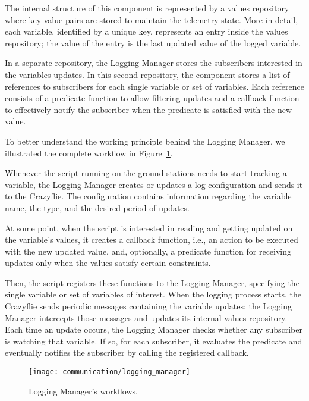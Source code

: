 The internal structure of this component is represented by a values repository where key-value pairs are stored to maintain the telemetry state.
More in detail, each variable, identified by a unique key, represents an entry inside the values repository; the value of the entry is the last updated value of the logged variable.

In a separate repository, the Logging Manager stores the subscribers interested in the variables updates. 
In this second repository, the component stores a list of references to subscribers for each single variable or set of variables. 
Each reference consists of a predicate function to allow filtering updates and a callback function to effectively notify the subscriber when the predicate is satisfied with the new value.

To better understand the working principle behind the Logging Manager, we illustrated the complete workflow in Figure~\ref{fig:logging_manager}.

Whenever the script running on the ground stations needs to start tracking a variable, the Logging Manager creates or updates a log configuration and sends it to the Crazyflie.
The configuration contains information regarding the variable name, the type, and the desired period of updates. 

At some point, when the script is interested in reading and getting updated on the variable's values, it creates a callback function, i.e., an action to be executed with the new updated value, and, optionally, a predicate function for receiving updates only when the values satisfy certain constraints.

Then, the script registers these functions to the Logging Manager, specifying the single variable or set of variables of interest.
When the logging process starts, the Crazyflie sends periodic messages containing the variable updates; the Logging Manager intercepts those messages and updates its internal values repository.
Each time an update occurs, the Logging Manager checks whether any subscriber is watching that variable. 
If so, for each subscriber, it evaluates the predicate and eventually notifies the subscriber by calling the registered callback. 

\begin{figure}[tb]
    \centering
    \texttt{[image: communication/logging\_manager]}
    \caption{Logging Manager's workflows.}\label{fig:logging_manager}
\end{figure}

